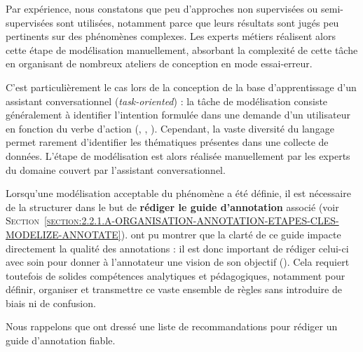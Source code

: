 			\begin{leftBarAuthorOpinion}
				Par expérience, nous constatons que peu d'approches non supervisées ou semi-supervisées sont utilisées, notamment parce que leurs résultats sont jugés peu pertinents sur des phénomènes complexes.
				Les experts métiers réalisent alors cette étape de modélisation manuellement, absorbant la complexité de cette tâche en organisant de nombreux ateliers de conception en mode essai-erreur.
				
				C'est particulièrement le cas lors de la conception de la base d'apprentissage d'un assistant conversationnel (\textit{task-oriented}) : la tâche de modélisation consiste généralement à identifier l'intention formulée dans une demande d'un utilisateur en fonction du verbe d'action (, , ).
				Cependant, la vaste diversité du langage permet rarement d'identifier les thématiques présentes dans une collecte de données.
				L'étape de modélisation est alors réalisée manuellement par les experts du domaine couvert par l'assistant conversationnel.
			\end{leftBarAuthorOpinion}
			
			Lorsqu'une modélisation acceptable du phénomène a été définie, il est nécessaire de la structurer dans le but de \textbf{rédiger le guide d'annotation} associé (voir \textsc{Section~\ref{section:2.2.1.A-ORGANISATION-ANNOTATION-ETAPES-CLES-MODELIZE-ANNOTATE}}).
			\cite{nedellec-etal:2006:annotation-guidelines-machine} ont pu montrer que la clarté de ce guide impacte directement la qualité des annotations : il est donc important de rédiger celui-ci avec soin pour donner à l'annotateur une vision de son objectif (\cite{fort-etal:2009:vers-methodologie-annotation}).
			Cela requiert toutefois de solides compétences analytiques et pédagogiques, notamment pour définir, organiser et transmettre ce vaste ensemble de règles sans introduire de biais ni de confusion.
			\begin{leftBarInformation}
				Nous rappelons que \cite{dipper-etal:2004:useradaptive-annotation-guidelines} ont dressé une liste de recommandations pour rédiger un guide d'annotation fiable.
			\end{leftBarInformation}
			
